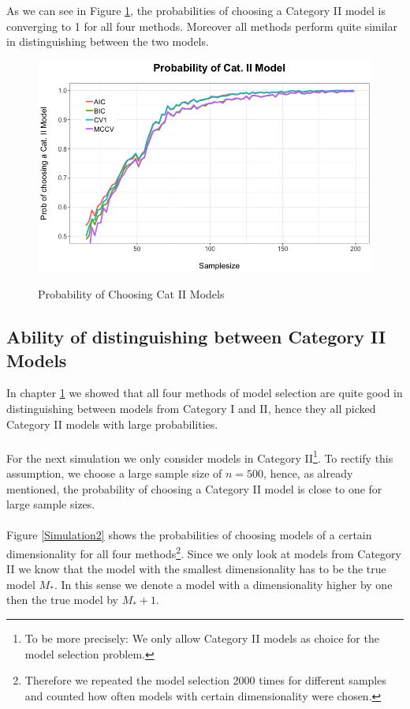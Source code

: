 \documentclass[Research_Module_ES.tex]{subfiles}
\begin{document}
As we can see in Figure \ref{Simulation1}, the probabilities of choosing a Category II model is converging to 1 for all four methods. Moreover all methods perform quite similar in distinguishing between the two models. 
\begin{figure}[!h]
	\centering
	\includegraphics[width=1\textwidth]{Simulation1_XDeterministic.png}\\
\caption{Probability of Choosing Cat II Models}\label{Simulation1}
\end{figure}
\subsection{Ability of distinguishing  between Category II Models}
In chapter \ref{Simulation1} we showed that all four methods of model selection are quite good in distinguishing between models from Category I and II, hence they all picked Category II models with large probabilities. \\
\\
For the next simulation we only consider models in Category II\footnote{To be more precisely: We only allow Category II models as choice for the model selection problem.}. To rectify this assumption, we choose a large sample size of $n=500$, hence, as already mentioned, the probability of choosing a Category II model is close to one for large sample sizes.\\
\\
Figure \ref{Simulation2} shows the probabilities of choosing models of a certain dimensionality for all four methods\footnote{Therefore we repeated the model selection 2000 times for different samples and counted how often models with certain dimensionality were chosen.}. Since we only look at models from Category II we know that the model with the smallest dimensionality has to be the true model $M_\ast$. In this sense we denote a model with a dimensionality higher by one then the true model by $M_\ast+1$.\\
\end{document}
